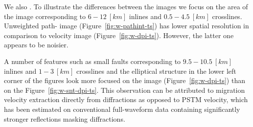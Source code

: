 We also .
To illustrate the differences between the images
we focus on the area of the image corresponding to $6-12\ [km]$ inlines and $0.5-4.5\ [km]$ crosslines.
Unweighted path- image (Figure~\ref{fig:w-pathint-ts}) has lower spatial resolution in comparison 
to  velocity image (Figure~\ref{fig:w-dpi-ts}). However, the latter one appears to be noisier. 


A number of features such
as small faults corresponding to $9.5-10.5\ [km]$ inlines and $1-3\ [km]$ crosslines and the elliptical structure
in the lower left corner of the figures look more focused on the  image (Figure~\ref{fig:w-dpi-ts}) than
on the Figure~\ref{fig:w-snt-dpi-ts}. This observation can be attributed 
to  migration velocity extraction directly from diffractions as opposed to PSTM velocity, which 
has been estimated on
conventional full-waveform data containing significantly stronger reflections masking diffractions.


